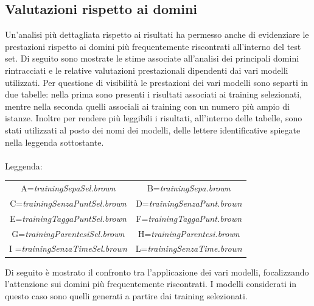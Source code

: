 \documentclass[a4paper]{report}
\begin{document}
\subsection{Valutazioni rispetto ai domini}
Un'analisi più dettagliata rispetto ai risultati ha permesso anche di evidenziare le prestazioni rispetto ai domini più frequentemente riscontrati all'interno del test set. Di seguito sono mostrate le stime associate all'analisi dei principali domini rintracciati e le relative valutazioni prestazionali dipendenti dai vari modelli utilizzati. Per questione di visibilità le prestazioni dei vari modelli sono separti in due tabelle: nella prima sono presenti i risultati associati ai training selezionati, mentre nella seconda quelli associali ai training con un numero più ampio di istanze. Inoltre per rendere più leggibili i risultati, all'interno delle tabelle, sono stati utilizzati al posto dei nomi dei modelli, delle lettere identificative spiegate nella leggenda sottostante.\\ \\ 
Leggenda:
\begin{center}
\begin{tabular}{cc}
A=\textit{trainingSepaSel.brown} & B=\textit{trainingSepa.brown}\\
C=\textit{trainingSenzaPuntSel.brown} & D=\textit{trainingSenzaPunt.brown} \\
E=\textit{trainingTaggaPuntSel.brown} & F=\textit{trainingTaggaPunt.brown}\\
G=\textit{trainingParentesiSel.brown} & H=\textit{trainingParentesi.brown} \\
I =\textit{trainingSenzaTimeSel.brown} & L=\textit{trainingSenzaTime.brown} \\
\end{tabular}
\end{center}
Di seguito è mostrato il confronto tra l'applicazione dei vari modelli, focalizzando l'attenzione sui domini più frequentemente riscontrati. I modelli considerati in questo caso sono quelli generati a partire dai training selezionati.
\end{document}
